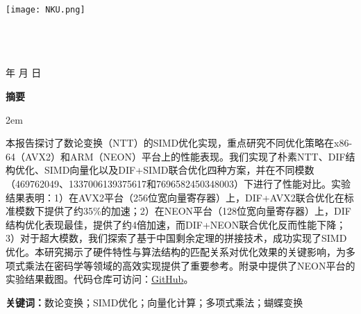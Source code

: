 \documentclass[a4paper,colorlinks=true,linkcolor=blue,urlcolor=blue,citecolor=green,bookmarks=true]{article}
\newenvironment{cnabstract}{
    \par\small
    \noindent\mbox{}\par\vspace{-\baselineskip}
    \par\songti\parindent 2em
    }
    {\par\vspace{1em}}
\begin{document}
\renewcommand{\contentsname}{目录}
\renewcommand{\appendixname}{附录}
\renewcommand{\appendixpagename}{附录}
\renewcommand{\refname}{参考文献} 
\renewcommand{\figurename}{图}
\renewcommand{\tablename}{表}
\renewcommand{\abstractname}{摘要}
\renewcommand{\today}{\number\year 年 \number\month 月 \number\day 日}

\renewcommand {\thefigure}{\thesection{}.\arabic{figure}}%
\renewcommand{\figurename}{图}
\renewcommand{\contentsname}{目录}  

\begin{titlepage}
    \begin{center}
    \texttt{[image: NKU.png]}\\[1cm]
    \vspace{20mm}
		\textbf{\huge\textbf{}}\\[0.5cm]
		\textbf{\huge{}}\\[2.3cm]
		\textbf{\Huge\textbf{}}

		\vspace{\fill}
    
    \centering
    \textsc{\LARGE {}}\\[0.5cm]
    
    \vfill
    {\Large \today}
    \end{center}
\end{titlepage}

\clearpage
{}
\begin{center}{\songti\bfseries{摘\quad 要}}\end{center}\par\vspace{0.5em}
\begin{cnabstract}
本报告探讨了数论变换（NTT）的SIMD优化实现，重点研究不同优化策略在x86-64（AVX2）和ARM（NEON）平台上的性能表现。我们实现了朴素NTT、DIF结构优化、SIMD向量化以及DIF+SIMD联合优化四种方案，并在不同模数（469762049、1337006139375617和7696582450348003）下进行了性能对比。实验结果表明：1）在AVX2平台（256位宽向量寄存器）上，DIF+AVX2联合优化在标准模数下提供了约35\%的加速；2）在NEON平台（128位宽向量寄存器）上，DIF结构优化表现最佳，提供了约4倍加速，而DIF+NEON联合优化反而性能下降；3）对于超大模数，我们探索了基于中国剩余定理的拼接技术，成功实现了SIMD优化。本研究揭示了硬件特性与算法结构的匹配关系对优化效果的关键影响，为多项式乘法在密码学等领域的高效实现提供了重要参考。附录中提供了NEON平台的实验结果截图。代码仓库可访问：\href{https://github.com/aokimi0/parallel-programming}{GitHub}。

\vspace{1em}
\noindent\textbf{关键词：}数论变换；SIMD优化；向量化计算；多项式乘法；蝴蝶变换
\end{cnabstract}
\end{document}
